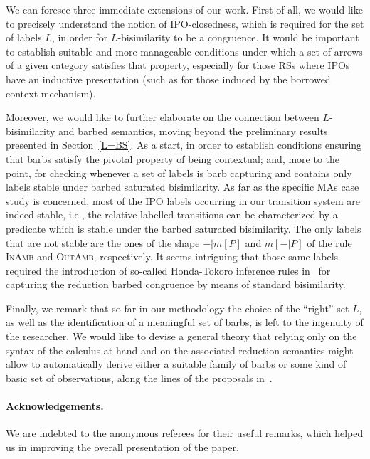 \documentclass[copyright,creativecommons]{eptcs}
\newcommand{\<}{\langle}
\renewcommand{\>}{\rangle}
\begin{document}
We can foresee three immediate extensions of our work. First of all,
we would like to precisely understand the notion of IPO-closedness,
which is required for the set of labels $L$, in order for
$L$-bisimilarity to be a congruence. It would be important to
establish suitable and more manageable conditions under which a set of
arrows of a given category satisfies that property, especially for
those RSs where IPOs have an inductive presentation (such as for those
induced by the borrowed context mechanism).

Moreover, we would like to further elaborate on the connection between
$L$-bisimilarity and barbed semantics, moving beyond the preliminary
results presented in Section~\ref{L=BS}. As a start, in order to
establish conditions ensuring that barbs satisfy the pivotal property
of being contextual; and, more to the point, for checking whenever a
set of labels is barb capturing and contains only labels stable under
barbed saturated bisimilarity.
As far as the specific MAs case study
is concerned, most of the IPO labels occurring in our transition
system are indeed stable, i.e., the relative labelled transitions
can be characterized by a
predicate which is stable under the barbed saturated bisimilarity.
The only labels that are not stable are the ones
of the shape $-|m[P]$ and $m[-|P]$ of the rule \textsc{InAmb}
and \textsc{OutAmb}, respectively.
It seems intriguing that those same labels required the
introduction of so-called Honda-Tokoro inference rules
in~\cite{PawelAmbient} for capturing the reduction barbed congruence
by means of standard bisimilarity.

Finally, we remark that so far in our methodology the choice of the
``right'' set $L$, as well as the identification of a meaningful set
of barbs, is left to the ingenuity of the researcher. We would like to
devise a general theory that relying only on the syntax of the
calculus at hand and on the associated reduction semantics might allow
to automatically derive either a suitable family of barbs or some kind
of basic set of observations, along the lines of the proposals
in~\cite{HY,PawBarbs,RathkeS09}.

\paragraph{\textbf Acknowledgements.}
We are indebted to the anonymous referees for their useful remarks, which helped
us in improving the overall presentation of the paper.



\end{document}

